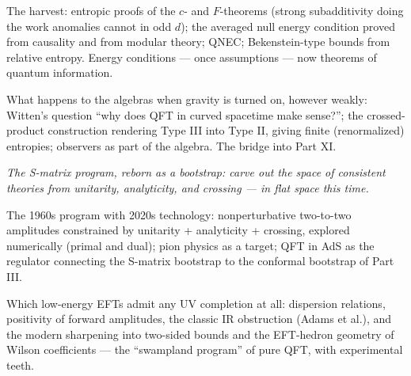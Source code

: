 The harvest: entropic proofs of the $c$- and $F$-theorems (strong subadditivity doing the work anomalies cannot in odd $d$); the averaged null energy condition proved from causality and from modular theory; QNEC; Bekenstein-type bounds from relative entropy. Energy conditions --- once assumptions --- now theorems of quantum information.

What happens to the algebras when gravity is turned on, however weakly: Witten's question ``why does QFT in curved spacetime make sense?''; the crossed-product construction rendering Type III into Type II, giving finite (renormalized) entropies; observers as part of the algebra. The bridge into Part XI.


\noin \emph{The S-matrix program, reborn as a bootstrap: carve out the space of consistent theories from unitarity, analyticity, and crossing --- in flat space this time.}

The 1960s program with 2020s technology: nonperturbative two-to-two amplitudes constrained by unitarity + analyticity + crossing, explored numerically (primal and dual); pion physics as a target; QFT in AdS as the regulator connecting the S-matrix bootstrap to the conformal bootstrap of Part III.

Which low-energy EFTs admit any UV completion at all: dispersion relations, positivity of forward amplitudes, the classic IR obstruction (Adams et al.), and the modern sharpening into two-sided bounds and the EFT-hedron geometry of Wilson coefficients --- the ``swampland program'' of pure QFT, with experimental teeth.

